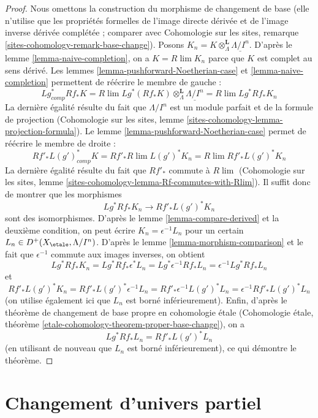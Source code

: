 \begin{proof}
Nous omettons la construction du morphisme de changement de base (elle n'utilise que
les propriétés formelles de l'image directe dérivée et de l'image inverse dérivée complétée ;
comparer avec
Cohomologie sur les sites, remarque \ref{sites-cohomology-remark-base-change}).
Posons $K_n = K \otimes^\mathbf{L}_\Lambda \underline{\Lambda/I^n}$.
D'après le lemme \ref{lemma-naive-completion}, on a $K = R\lim K_n$
parce que $K$ est complet au sens dérivé.
Les lemmes \ref{lemma-pushforward-Noetherian-case} et
\ref{lemma-naive-completion} permettent de réécrire le membre de gauche :
$$
Lg_{comp}^* Rf_* K =
R\lim Lg^*(Rf_*K)\otimes^\mathbf{L}_\Lambda \underline{\Lambda/I^n} =
R\lim Lg^* Rf_* K_n
$$
La dernière égalité résulte du fait que $\Lambda/I^n$ est un module parfait et de
la formule de projection (Cohomologie sur les sites, lemme
\ref{sites-cohomology-lemma-projection-formula}).
Le lemme \ref{lemma-pushforward-Noetherian-case} permet de réécrire le membre de
droite :
$$
Rf'_* L(g')^*_{comp} K =
Rf'_* R\lim L(g')^* K_n  =
R\lim Rf'_* L(g')^* K_n
$$
La dernière égalité résulte du fait que $Rf'_*$ commute à $R\lim$
(Cohomologie sur les sites, lemme
\ref{sites-cohomology-lemma-Rf-commutes-with-Rlim}).
Il suffit donc de montrer que les morphismes
$$
Lg^* Rf_* K_n \longrightarrow Rf'_* L(g')^* K_n
$$
sont des isomorphismes. D'après le lemme \ref{lemma-compare-derived} et la deuxième
condition, on peut écrire $K_n = \epsilon^{-1}L_n$ pour un certain
$L_n \in D^+(X_\etale, \Lambda/I^n)$. D'après le lemme \ref{lemma-morphism-comparison}
et le fait que $\epsilon^{-1}$ commute aux images inverses,
on obtient
$$
Lg^* Rf_* K_n =
Lg^* Rf_* \epsilon^*L_n =
Lg^* \epsilon^{-1} Rf_* L_n =
\epsilon^{-1} Lg^* Rf_* L_n
$$
et
$$
Rf'_* L(g')^* K_n =
Rf'_* L(g')^* \epsilon^{-1} L_n =
Rf'_* \epsilon^{-1} L(g')^* L_n =
\epsilon^{-1} Rf'_* L(g')^* L_n
$$
(on utilise également ici que $L_n$ est borné inférieurement).
Enfin, d'après le théorème de changement de base propre en cohomologie \'etale
(Cohomologie étale, théorème
\ref{etale-cohomology-theorem-proper-base-change}), on a
$$
Lg^* Rf_* L_n = Rf'_* L(g')^* L_n
$$
(en utilisant de nouveau que $L_n$ est borné inférieurement),
ce qui démontre le théorème.
\end{proof}






\section{Changement d'univers partiel}
\label{section-change-universe}

